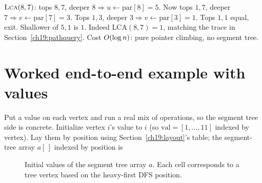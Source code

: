 \begin{algorithm}[H]
\caption{\textsc{Lca}$(u,v)$ via heavy paths}
\label{ch19:alg-lca}
\DontPrintSemicolon
{}
 
\end{algorithm}

\begin{labbox}
$\textsc{Lca}(8,7)$: tops $8,7$, deeper $8\Rightarrow u\gets\mathrm{par}[8]=5$. Now tops $1,7$, deeper
$7\Rightarrow v\gets\mathrm{par}[7]=3$. Tops $1,3$, deeper $3\Rightarrow v\gets\mathrm{par}[3]=1$. Tops
$1,1$ equal, exit. Shallower of $5,1$ is $1$. Indeed $\mathrm{LCA}(8,7)=1$, matching the trace in
Section~\ref{ch19:pathquery}. Cost $O(\log n)$: pure pointer climbing, no segment tree.
\end{labbox}

\section{Worked end-to-end example with values}
\label{ch19:fullexample}

Put a value on each vertex and run a real mix of operations, so the segment tree side is concrete.
Initialize vertex $i$'s value to $i$ (so $\mathrm{val}=[1,\dots,11]$ indexed by vertex). Lay them by
position using Section~\ref{ch19:layout}'s table; the segment-tree array $a[\,]$ indexed by position is

\begin{figure}[htbp]
\centering
{}
\caption{Initial values of the segment tree array $a$. Each cell corresponds to a tree vertex based on the heavy-first DFS position.}
\label{ch19:fig-initarray}
\end{figure}

